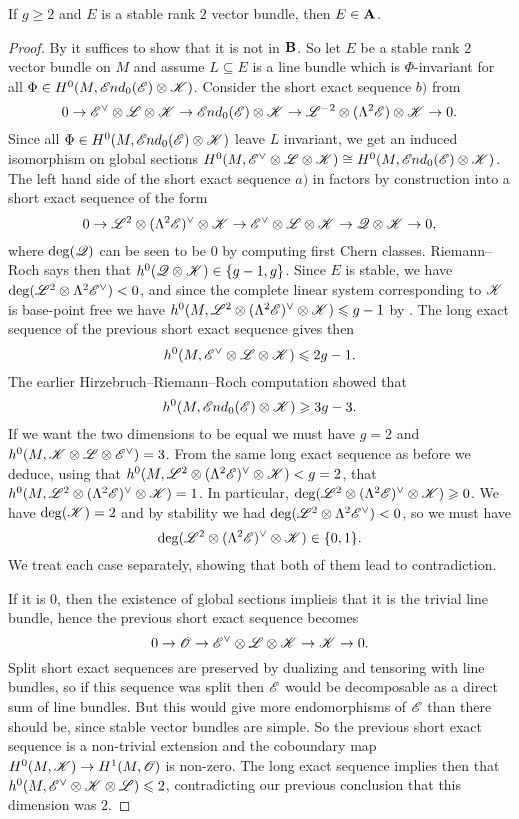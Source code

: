 \documentclass[A4paper, 12pt, british, reqno]{amsart}
\newcommand{\ot}{\otimes}
\newcommand{\dual}{^{\vee}}
\begin{document}
\begin{lm}\label{lm:stable}
    If $g\geqslant 2$ and $E$ is a stable rank $2$ vector bundle, then $E\in \mathbf{A}$.
    \begin{proof}
	By  it suffices to show that it is not in $\mathbf{B}$.
	So let $E$ be a stable rank $2$ vector bundle on $M$ and assume $L\subseteq E$ is a line bundle which is $\Phi$-invariant for all $\Phi\in H^{0}(M,\sEnd_{0}(\E)\ot \sK)$.
	Consider the short exact sequence $b)$ from 
	\[ 0\to \E\dual\ot \L\ot\sK\to \sEnd_{0}(\E)\ot \sK \to \L^{-2}\ot (\Lambda^{2}\E)\ot\sK\to 0. \]
	Since all $\Phi\in H^{0}(M,\sEnd_{0}(\E)\ot\sK)$ leave $L$ invariant, we get an induced isomorphism on global sections $H^{0}(M,\E\dual\ot\L\ot\sK)\cong H^{0}(M,\sEnd_{0}(\E)\ot \sK)$.
	The left hand side of the short exact sequence $a)$ in  factors by construction into a short exact sequence of the form 
	\[ 0\to \L^{2}\ot (\Lambda^{2}\E)\dual\ot\sK \to \E\dual \ot \L\ot \sK\to \sQ\ot\sK\to 0, \]
	where $\deg(\mathscr{Q})$ can be seen to be $0$ by computing first Chern classes.
	Riemann--Roch says then that $h^{0}(\sQ\ot\sK)\in \{g-1,g\}$.
	Since $E$ is stable, we have $\deg(\L^{2}\ot \Lambda^{2}\E\dual)<0$, and since the complete linear system corresponding to $\mathscr{K}$ is base-point free \cite[Lemma IV.5.1]{har77}
	    we have $h^{0}(M,\L^{2}\ot(\Lambda^{2}\E)\dual\ot\sK)\leqslant g-1$ by \cite[Proposition IV.3.1]{har77}.
	The long exact sequence of the previous short exact sequence gives then
	\[ h^{0}(M,\E\dual\ot\L\ot\sK)\leqslant 2g-1. \]
	The earlier Hirzebruch--Riemann--Roch computation showed that
	\[ h^{0}(M,\sEnd_{0}(\E)\ot \sK)\geqslant 3g-3. \]
	If we want the two dimensions to be equal we must have $g=2$ and $h^{0}(M,\sK\ot\L\ot\E\dual)=3$.
	From the same long exact sequence as before we deduce, using that $h^{0}(M,\L^{2}\ot (\Lambda^{2}\E)\dual\ot \sK)<g=2$, that $h^{0}(M,\L^{2}\ot(\Lambda^{2}\E)\dual\ot\sK)=1$.
	In particular, $\deg(\L^{2}\ot(\Lambda^{2}\E)\dual\ot\sK)\geqslant 0$.
	We have $\deg(\mathscr{K})=2$ and by stability we had $\deg(\L^{2}\ot \Lambda^{2}\E\dual)<0$, so we must have
	\[ \deg(\L^{2}\ot (\Lambda^{2}\E)\dual\ot\sK)\in \{0,1\}. \]
	We treat each case separately, showing that both of them lead to contradiction.

	\color{gray}
	If it is $0$, then the existence of global sections implieis that it is the trivial line bundle, hence the previous short exact sequence becomes
	\[ 0\to \O\to \E\dual\ot\L\ot\sK\to \sK\to 0. \]
	Split short exact sequences are preserved by dualizing and tensoring with line bundles, so if this sequence was split then $\mathscr{E}$ would be decomposable as a direct sum of line bundles.
	But this would give more endomorphisms of $\mathscr{E}$ than there should be, since stable vector bundles are simple.
	So the previous short exact sequence is a non-trivial extension and the coboundary map $H^{0}(M,\mathscr{K})\to H^{1}(M,\mathscr{O})$ is non-zero.
	The long exact sequence implies then that $h^{0}(M,\E\dual\ot \sK\ot\L)\leqslant 2$, contradicting our previous conclusion that this dimension was $2$.


\end{proof}
\end{lm}
\end{document}
